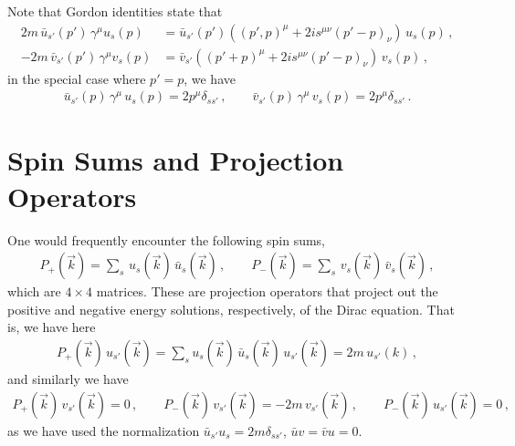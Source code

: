 \documentclass[11pt, onesided]{book}
\theoremstyle{break}
\theoremstyle{break}
\begin{document}
Note that Gordon identities state that
\begin{align*}
2m\, \bar{u}_{s'}(p') \, \gamma^{\mu} u_s(p) &= \bar{u}_{s'}(p') \left((p',p)^{\mu} + 2is^{\mu\nu}(p'-p)_{\nu}  \right) \, u_s(p)\,,\\
-2m\, \bar{v}_{s'}(p') \, \gamma^{\mu} v_s(p) &= \bar{v}_{s'}\left((p'+p)^{\mu} + 2i s^{\mu\nu}(p' - p)_{\nu} \right)\, v_{s}(p)\,,
\end{align*}
in the special case where $p' = p$, we have
\begin{align*}
\bar{u}_{s'}(p) \, \gamma^\mu \, u_s(p) = 2p^{\mu} \delta_{ss'}\,,\qquad
\bar{v}_{s'}(p) \, \gamma^\mu \, v_s(p) = 2p^{\mu} \delta_{ss'}\,. 
\end{align*} 


\section[Spin Sums and Projection Operators]{\color{red}Spin Sums and Projection Operators\color{black}}
One would frequently encounter the following spin sums, 
\begin{align*}
P_+(\vec{k}) = \sum_s \, u_s(\vec{k}) \, \bar{u}_s(\vec{k})\,,\qquad
P_-(\vec{k}) = \sum_s \, v_s(\vec{k}) \, \bar{v}_s(\vec{k})\,,
\end{align*}
which are $4\times 4$ matrices. These are projection operators that project out the 
positive and negative energy solutions, respectively, of the Dirac equation. That is, we have here
\begin{align*}
P_+(\vec{k}) \, u_{s'}(\vec{k}) = \sum_s u_s(\vec{k})\, \bar{u}_s(\vec{k}) \, u_{s'}(\vec{k}) = 2m\, u_{s'}(k)\,,
\end{align*}
and similarly we have
\begin{align*}
P_+(\vec{k}) \, v_{s'}(\vec{k}) = 0\,,\qquad
P_-(\vec{k}) \, v_{s'}(\vec{k}) = -2m\, v_{s'}(\vec{k})\,,\qquad
P_-(\vec{k})\, u_{s'}(\vec{k}) = 0\,,
\end{align*}
as we have used the normalization $\bar{u}_{s'}u_s = 2m \delta_{ss'}$, $\bar{u}v = \bar{v} u = 0$.\\ 
\end{document}
